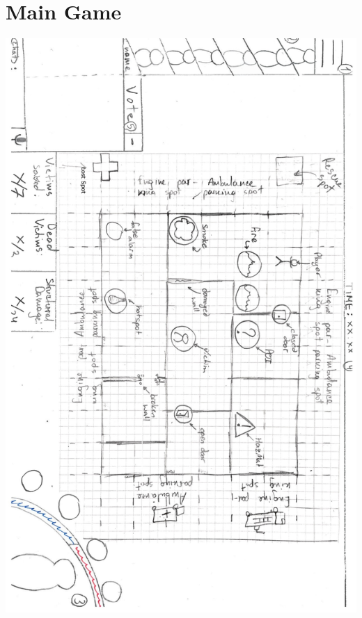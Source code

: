 \documentclass[12pt]{article}
\theoremstyle{definition}
\begin{document}
\part{Main Game}
\includegraphics[width=\textwidth, height=\textheight]{HUD}
\end{document}

